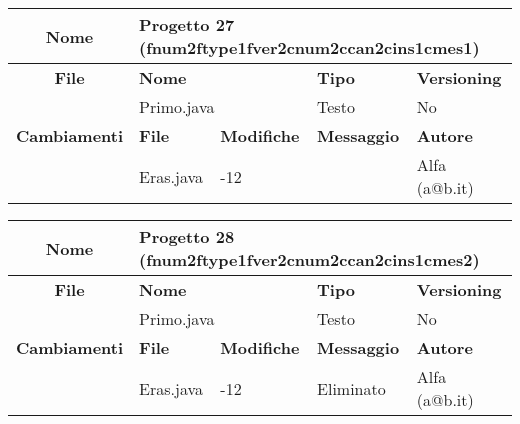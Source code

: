 

\begin{table}[ht]
\footnotesize
\begin{tabular}{|c|p{2.5cm}|p{2cm}|p{2.5cm}|p{2.5cm}|}
  \hline
  \textbf{Nome}	& \multicolumn{4}{l|}{Progetto 27 (fnum2ftype1fver2cnum2ccan2cins1cmes1)} 								\\
  \hline
  \rowcolor{lightgray}\textbf{File} 		& \multicolumn{2}{l|}{\textbf{Nome}}		& \textbf{Tipo}		& \textbf{Versioning} 		\\
						\cline{2-5}
						& \multicolumn{2}{l|}{Primo.java}		& Testo			& No				\\
  \hline
  \rowcolor{lightgray}\textbf{Cambiamenti}	& \textbf{File}		&\textbf{Modifiche}	& \textbf{Messaggio}	& \textbf{Autore}		\\
						\cline{2-5}
						& Eras.java		& -12	  		& 			& Alfa (a@b.it)			\\
						
  \hline
\end{tabular}
\end{table}

\clearpage
\begin{table}[ht]
\footnotesize
\begin{tabular}{|c|p{2.5cm}|p{2cm}|p{2.5cm}|p{2.5cm}|}
  \hline
  \textbf{Nome}	& \multicolumn{4}{l|}{Progetto 28 (fnum2ftype1fver2cnum2ccan2cins1cmes2)} 								\\
  \hline
  \rowcolor{lightgray}\textbf{File} 		& \multicolumn{2}{l|}{\textbf{Nome}}		& \textbf{Tipo}		& \textbf{Versioning} 		\\
						\cline{2-5}
						& \multicolumn{2}{l|}{Primo.java}		& Testo			& No				\\
  \hline
  \rowcolor{lightgray}\textbf{Cambiamenti}	& \textbf{File}		&\textbf{Modifiche}	& \textbf{Messaggio}	& \textbf{Autore}		\\
						\cline{2-5}
						& Eras.java		& -12	  		& Eliminato		& Alfa (a@b.it)			\\
						
  \hline
\end{tabular}
\end{table}




